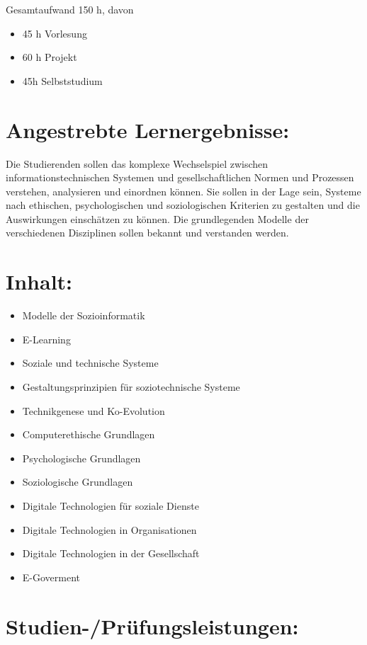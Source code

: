 Gesamtaufwand 150 h, davon

\begin{itemize}
\tightlist
\item
  45 h Vorlesung
\item
  60 h Projekt
\item
  45h Selbststudium
\end{itemize}

\section{Angestrebte
Lernergebnisse:}\label{angestrebte-lernergebnisse-24}

Die Studierenden sollen das komplexe Wechselspiel zwischen
informationstechnischen Systemen und gesellschaftlichen Normen und
Prozessen verstehen, analysieren und einordnen können. Sie sollen in der
Lage sein, Systeme nach ethischen, psychologischen und soziologischen
Kriterien zu gestalten und die Auswirkungen einschätzen zu können. Die
grundlegenden Modelle der verschiedenen Disziplinen sollen bekannt und
verstanden werden.

\section{Inhalt:}\label{inhalt-24}

\begin{itemize}
\item
  Modelle der Sozioinformatik
\item
  E-Learning
\item
  Soziale und technische Systeme
\item
  Gestaltungsprinzipien für soziotechnische Systeme
\item
  Technikgenese und Ko-Evolution
\item
  Computerethische Grundlagen
\item
  Psychologische Grundlagen
\item
  Soziologische Grundlagen
\item
  Digitale Technologien für soziale Dienste
\item
  Digitale Technologien in Organisationen
\item
  Digitale Technologien in der Gesellschaft
\item
  E-Goverment
\end{itemize}

\section{Studien-/Prüfungsleistungen:}\label{studien-pruxfcfungsleistungen-24}

